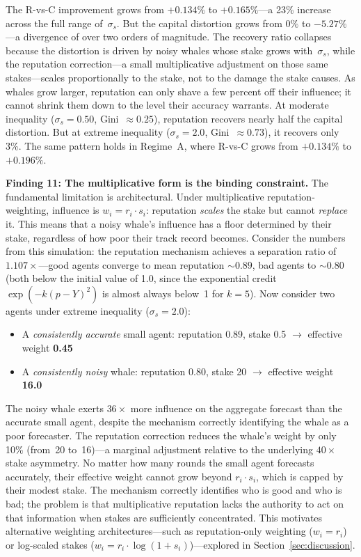\documentclass[conference]{IEEEtran}
\begin{document}
The R-vs-C improvement grows from $+0.134\%$ to $+0.165\%$---a 23\% increase across the full range of~$\sigma_s$. But the capital distortion grows from $0\%$ to $-5.27\%$---a divergence of over two orders of magnitude. The recovery ratio collapses because the distortion is driven by noisy whales whose stake grows with~$\sigma_s$, while the reputation correction---a small multiplicative adjustment on those same stakes---scales proportionally to the stake, not to the damage the stake causes. As whales grow larger, reputation can only shave a few percent off their influence; it cannot shrink them down to the level their accuracy warrants. At moderate inequality ($\sigma_s = 0.50$, Gini~$\approx 0.25$), reputation recovers nearly half the capital distortion. But at extreme inequality ($\sigma_s = 2.0$, Gini~$\approx 0.73$), it recovers only 3\%. The same pattern holds in Regime~A, where R-vs-C grows from $+0.134\%$ to $+0.196\%$.

\smallskip\noindent\textbf{Finding 11: The multiplicative form is the binding constraint.} The fundamental limitation is architectural. Under multiplicative reputation-weighting, influence is $w_i = r_i \cdot s_i$: reputation \emph{scales} the stake but cannot \emph{replace} it. This means that a noisy whale's influence has a floor determined by their stake, regardless of how poor their track record becomes. Consider the numbers from this simulation: the reputation mechanism achieves a separation ratio of $1.107\times$---good agents converge to mean reputation ${\sim}0.89$, bad agents to ${\sim}0.80$ (both below the initial value of 1.0, since the exponential credit $\exp(-k(p-Y)^2)$ is almost always below~1 for $k=5$). Now consider two agents under extreme inequality ($\sigma_s = 2.0$):
\begin{itemize}
    \item A \emph{consistently accurate} small agent: reputation 0.89, stake 0.5 $\rightarrow$ effective weight \textbf{0.45}
    \item A \emph{consistently noisy} whale: reputation 0.80, stake 20 $\rightarrow$ effective weight \textbf{16.0}
\end{itemize}
The noisy whale exerts $36\times$ more influence on the aggregate forecast than the accurate small agent, despite the mechanism correctly identifying the whale as a poor forecaster. The reputation correction reduces the whale's weight by only 10\% (from~20 to~16)---a marginal adjustment relative to the underlying $40\times$ stake asymmetry. No matter how many rounds the small agent forecasts accurately, their effective weight cannot grow beyond $r_i \cdot s_i$, which is capped by their modest stake. The mechanism correctly identifies who is good and who is bad; the problem is that multiplicative reputation lacks the authority to act on that information when stakes are sufficiently concentrated. This motivates alternative weighting architectures---such as reputation-only weighting ($w_i = r_i$) or log-scaled stakes ($w_i = r_i \cdot \log(1 + s_i)$)---explored in Section~\ref{sec:discussion}.
\end{document}
